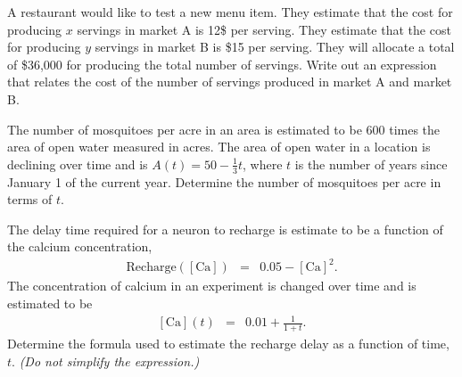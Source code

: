 
\begin{problem}
\item A restaurant would like to test a new menu item. They estimate
  that the cost for producing $x$ servings in market A is 12\$ per
  serving. They estimate that the cost for producing $y$ servings in
  market B is \$15 per serving.  They will allocate a total of
  \$36,000 for producing the total number of servings. Write out an
  expression that relates the cost of the number of servings produced
  in market A and market B.
  \vfill
\item The number of mosquitoes per acre in an area is estimated to be
  600 times the area of open water measured in acres. The area of open
  water in a location is declining over time and is
  $A(t)=50-\frac{1}{3}t$, where $t$ is the number of years since
  January 1 of the current year. Determine the number of mosquitoes
  per acre in terms of $t$.
  \vfill
\item The delay time required for a neuron to recharge is estimate to
  be a function of the calcium concentration,
  \begin{eqnarray*}
    \mathrm{Recharge([Ca])} & = & 0.05-\mathrm{[Ca]}^2.
  \end{eqnarray*}
  The concentration of calcium in an experiment is changed over time
  and is estimated to be
  \begin{eqnarray*}
    \mathrm{[Ca]}(t) & = & 0.01+\frac{1}{1+t}.
  \end{eqnarray*}
  Determine the formula used to estimate the recharge delay as a
  function of time, $t$. \textit{(Do not simplify the expression.)}
  \vfill
\end{problem}


